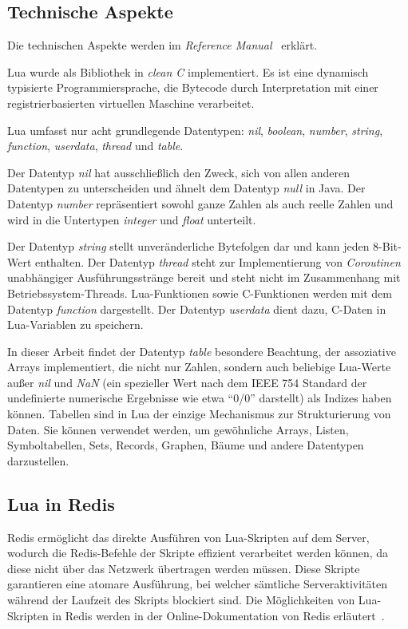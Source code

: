 \subsection{Technische Aspekte}
Die technischen Aspekte werden im \emph{Reference Manual}~\cite{ierusalimschy_lua_nodate-1} erklärt.

Lua wurde als Bibliothek in \emph{clean C} implementiert. Es ist eine dynamisch typisierte Programmiersprache, die Bytecode durch Interpretation mit einer registrierbasierten virtuellen Maschine verarbeitet.

Lua umfasst nur acht grundlegende Datentypen: \emph{nil}, \emph{boolean}, \emph{number}, \emph{string}, \emph{function}, \emph{userdata}, \emph{thread} und \emph{table}.

Der Datentyp \emph{nil} hat ausschließlich den Zweck, sich von allen anderen Datentypen zu unterscheiden und ähnelt dem Datentyp \emph{null} in Java. Der Datentyp \emph{number} repräsentiert sowohl ganze Zahlen als auch reelle Zahlen und wird in die Untertypen \emph{integer} und \emph{float} unterteilt.

Der Datentyp \emph{string} stellt unveränderliche Bytefolgen dar und kann jeden 8-Bit-Wert enthalten. Der Datentyp \emph{thread} steht zur Implementierung von \emph{Coroutinen} unabhängiger Ausführungsstränge bereit und steht nicht im Zusammenhang mit Betriebssystem-Threads.
Lua-Funktionen sowie C-Funktionen werden mit dem Datentyp \emph{function} dargestellt.
Der Datentyp \emph{userdata} dient dazu, C-Daten in Lua-Variablen zu speichern.

In dieser Arbeit findet der Datentyp \emph{table} besondere Beachtung, der assoziative Arrays implementiert, die nicht nur Zahlen, sondern auch beliebige Lua-Werte außer \emph{nil} und \emph{NaN} (ein spezieller Wert nach dem IEEE 754 Standard der undefinierte numerische Ergebnisse wie etwa \enquote{0/0} darstellt) als Indizes haben können.
Tabellen sind in Lua der einzige Mechanismus zur Strukturierung von Daten. Sie können verwendet werden, um gewöhnliche Arrays, Listen, Symboltabellen, Sets, Records, Graphen, Bäume und andere Datentypen darzustellen.

\subsection{Lua in Redis}
Redis ermöglicht das direkte Ausführen von Lua-Skripten auf dem Server, wodurch die Redis-Befehle der Skripte effizient verarbeitet werden können, da diese nicht über das Netzwerk übertragen werden müssen. Diese Skripte garantieren eine atomare Ausführung, bei welcher sämtliche Serveraktivitäten während der Laufzeit des Skripts blockiert sind. Die Möglichkeiten von Lua-Skripten in Redis werden in der Online-Dokumentation von Redis erläutert~\cite{redis_ltd_scripting_nodate}.

